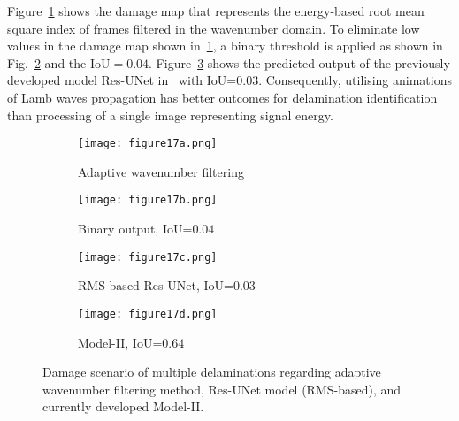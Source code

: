 \begin{sloppypar}
	Figure~\ref{fig:ERMSF} shows the damage map that represents the energy-based root mean square index of frames filtered in the wavenumber domain.
	To eliminate low values in the damage map shown in~\ref{fig:ERMSF}, a binary threshold is applied as shown in Fig.~\ref{fig:binary_ERMSF} and the IoU\(=0.04\).
	Figure~\ref{fig:Res_UNet} shows the predicted output of the previously developed model Res-UNet in~\cite{Ijjeh2022} with IoU=$0.03$.
	Consequently, utilising animations of Lamb waves propagation has better outcomes for delamination identification than processing of a single image representing signal energy.
	
	\begin{figure} [!ht]
		\begin{subfigure}[b]{.48\textwidth}
			\centering
			\texttt{[image: figure17a.png]}
			\caption{Adaptive wavenumber filtering}
			\label{fig:ERMSF}
		\end{subfigure}
		\hfill
		\begin{subfigure}[b]{.48\textwidth}
			\centering
			\texttt{[image: figure17b.png]}
			\caption{Binary output, IoU=$0.04$} 
			\label{fig:binary_ERMSF}
		\end{subfigure}
		\hfill
		\begin{subfigure}[b]{.48\textwidth}
			\centering
			\texttt{[image: figure17c.png]}
			\caption{RMS based Res-UNet, IoU=$0.03$} 
			\label{fig:Res_UNet}
		\end{subfigure}
		\hfill
		\begin{subfigure}[b]{.48\textwidth}
			\centering
			\texttt{[image: figure17d.png]}
			\caption{Model-II, IoU=\(0.64\)} 
			\label{fig:RMS_threshold_L3_S4_B_ijjeh_compare}
		\end{subfigure}
		\caption{Damage scenario of multiple delaminations regarding adaptive wavenumber filtering method, Res-UNet model (RMS-based), and currently developed Model-II.}
		\label{fig:comparison_all_models}
	\end{figure} 
\end{sloppypar}
